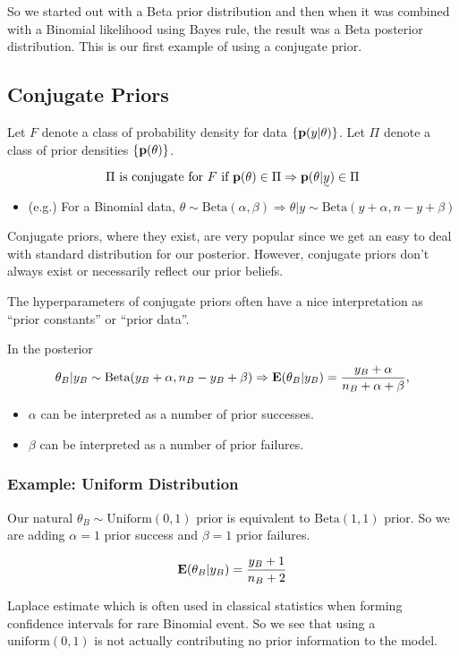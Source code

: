 So we started out with a Beta prior distribution and then when it was combined with a Binomial likelihood using Bayes rule, the result was a Beta posterior distribution. This is our first example of using a conjugate prior.

\subsection{Conjugate Priors}

Let $F$ denote a class of probability density for data $\{{\mathbf p}(y|\theta)\}$. Let $\Pi$ denote a class of prior densities $\{{\mathbf p}(\theta)\}$.

\[
\Pi \text{ is conjugate for $F$ if } \p(\theta) \in \Pi \Rightarrow \p(\theta| \vec{y}) \in \Pi
\]

\begin{itemize}
    \item (e.g.) For a Binomial data, $\theta \sim \text{Beta}(\alpha, \beta) \Rightarrow \theta| y \sim \text{Beta}(y+\alpha, n-y+\beta)$
\end{itemize}

Conjugate priors, where they exist, are very popular since we get an easy to deal with standard distribution for our posterior. However, conjugate priors don't always exist or necessarily reflect our prior beliefs.

The hyperparameters of conjugate priors often have a nice interpretation as ``prior constants'' or ``prior data''.

In the posterior
\[
    \theta_B | y_B \sim \text{Beta}(y_B+\alpha, n_B-y_B+\beta) \Rightarrow {\mathbf E}(\theta_B| y_B) = \frac{y_B + \alpha}{n_B + \alpha + \beta},
\]
\begin{itemize}
    \item $\alpha$ can be interpreted as a number of prior successes.
    \item $\beta$ can be interpreted as a number of prior failures.
\end{itemize}
\subsubsection*{Example: Uniform Distribution}
Our natural $\theta_B \sim \text{Uniform}(0, 1)$ prior is equivalent to $\text{Beta}(1, 1)$ prior. So we are adding $\alpha=1$ prior success and $\beta=1$ prior failures.

\[
{\mathbf E}(\theta_B | y_B) = \frac{y_B + 1}{n_B + 2}
\]

Laplace estimate which is often used in classical statistics when forming confidence intervals for rare Binomial event. So we see that using a $\text{uniform}(0, 1)$ is not actually contributing no prior information to the model.

